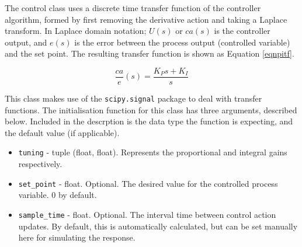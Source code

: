 \documentclass[twoside,a4]{report}
\def\br{\newline \newline \noindent}
\begin{document}
	\noindent
	The control class uses a discrete time transfer function of the controller algorithm, formed by first removing the derivative action and taking a Laplace transform. In Laplace domain notation; $U(s)$ or $ca(s)$ is the controller output, and $e(s)$ is the error between the process output (controlled variable) and the set point. The resulting transfer function is shown as Equation \ref{eqnpitf}.
	
	\begin{equation}
	\frac{ca}{e}(s) = \frac{K_P  s + K_I}{s}
	\label{eqnpitf}
	\end{equation}
	
	\noindent
	This class makes use of the \texttt{scipy.signal} package to deal with transfer functions.\br
	The initialisation function for this class has three arguments, described below. Included in the descrption is the data type the function is expecting, and the default value (if applicable).
	
	\begin{itemize}
		\item \texttt{tuning} - tuple (float, float). Represents the proportional and integral gains respectively.
		\item \texttt{set\_point} - float. Optional. The desired value for the controlled process variable. 0 by default.
		\item \texttt{sample\_time} - float. Optional. The interval time between control action updates. By default, this is automatically calculated, but can be set manually here for simulating the response.
	\end{itemize}
	
\end{document}
